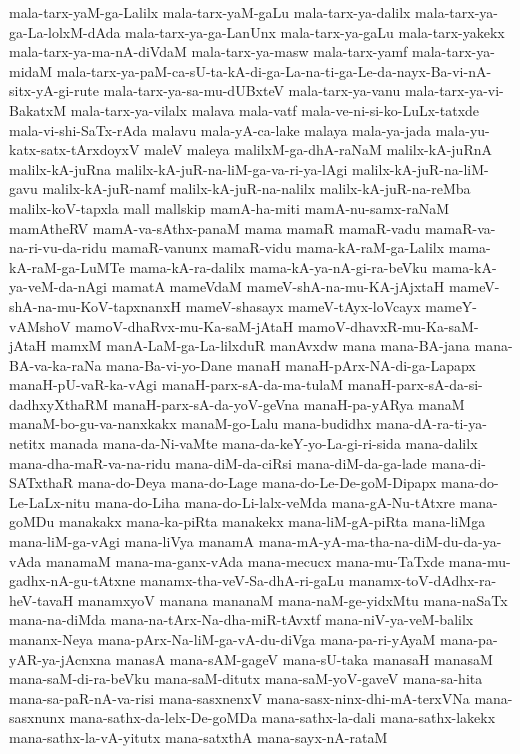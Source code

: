 {mala-tarx-yaM-ga-Lalilx
mala-tarx-yaM-gaLu
mala-tarx-ya-dalilx
mala-tarx-ya-ga-La-lolxM-dAda
mala-tarx-ya-ga-LanUnx
mala-tarx-ya-gaLu
mala-tarx-yakekx
mala-tarx-ya-ma-nA-diVdaM
mala-tarx-ya-masw
mala-tarx-yamf
mala-tarx-ya-midaM
mala-tarx-ya-paM-ca-sU-ta-kA-di-ga-La-na-ti-ga-Le-da-nayx-Ba-vi-nA-sitx-yA-gi-rute
mala-tarx-ya-sa-mu-dUBxteV
mala-tarx-ya-vanu
mala-tarx-ya-vi-BakatxM
mala-tarx-ya-vilalx
malava
mala-vatf
mala-ve-ni-si-ko-LuLx-tatxde
mala-vi-shi-SaTx-rAda
malavu
mala-yA-ca-lake
malaya
mala-ya-jada
mala-yu-katx-satx-tArxdoyxV
maleV
maleya
malilxM-ga-dhA-raNaM
malilx-kA-juRnA
malilx-kA-juRna
malilx-kA-juR-na-liM-ga-va-ri-ya-lAgi
malilx-kA-juR-na-liM-gavu
malilx-kA-juR-namf
malilx-kA-juR-na-nalilx
malilx-kA-juR-na-reMba
malilx-koV-tapxla
mall
mallskip
mamA-ha-miti
mamA-nu-samx-raNaM
mamAtheRV
mamA-va-sAthx-panaM
mama
mamaR
mamaR-vadu
mamaR-va-na-ri-vu-da-ridu
mamaR-vanunx
mamaR-vidu
mama-kA-raM-ga-Lalilx
mama-kA-raM-ga-LuMTe
mama-kA-ra-dalilx
mama-kA-ya-nA-gi-ra-beVku
mama-kA-ya-veM-da-nAgi
mamatA
mameVdaM
mameV-shA-na-mu-KA-jAjxtaH
mameV-shA-na-mu-KoV-tapxnanxH
mameV-shasayx
mameV-tAyx-loVcayx
mameY-vAMshoV
mamoV-dhaRvx-mu-Ka-saM-jAtaH
mamoV-dhavxR-mu-Ka-saM-jAtaH
mamxM
manA-LaM-ga-La-lilxduR
manAvxdw
mana
mana-BA-jana
mana-BA-va-ka-raNa
mana-Ba-vi-yo-Dane
manaH
manaH-pArx-NA-di-ga-Lapapx
manaH-pU-vaR-ka-vAgi
manaH-parx-sA-da-ma-tulaM
manaH-parx-sA-da-si-dadhxyXthaRM
manaH-parx-sA-da-yoV-geVna
manaH-pa-yARya
manaM
manaM-bo-gu-va-nanxkakx
manaM-go-Lalu
mana-budidhx
mana-dA-ra-ti-ya-netitx
manada
mana-da-Ni-vaMte
mana-da-keY-yo-La-gi-ri-sida
mana-dalilx
mana-dha-maR-va-na-ridu
mana-diM-da-ciRsi
mana-diM-da-ga-lade
mana-di-SATxthaR
mana-do-Deya
mana-do-Lage
mana-do-Le-De-goM-Dipapx
mana-do-Le-LaLx-nitu
mana-do-Liha
mana-do-Li-lalx-veMda
mana-gA-Nu-tAtxre
mana-goMDu
manakakx
mana-ka-piRta
manakekx
mana-liM-gA-piRta
mana-liMga
mana-liM-ga-vAgi
mana-liVya
manamA
mana-mA-yA-ma-tha-na-diM-du-da-ya-vAda
manamaM
mana-ma-ganx-vAda
mana-mecucx
mana-mu-TaTxde
mana-mu-gadhx-nA-gu-tAtxne
manamx-tha-veV-Sa-dhA-ri-gaLu
manamx-toV-dAdhx-ra-heV-tavaH
manamxyoV
manana
mananaM
mana-naM-ge-yidxMtu
mana-naSaTx
mana-na-diMda
mana-na-tArx-Na-dha-miR-tAvxtf
mana-niV-ya-veM-balilx
mananx-Neya
mana-pArx-Na-liM-ga-vA-du-diVga
mana-pa-ri-yAyaM
mana-pa-yAR-ya-jAcnxna
manasA
mana-sAM-gageV
mana-sU-taka
manasaH
manasaM
mana-saM-di-ra-beVku
mana-saM-ditutx
mana-saM-yoV-gaveV
mana-sa-hita
mana-sa-paR-nA-va-risi
mana-sasxnenxV
mana-sasx-ninx-dhi-mA-terxVNa
mana-sasxnunx
mana-sathx-da-lelx-De-goMDa
mana-sathx-la-dali
mana-sathx-lakekx
mana-sathx-la-vA-yitutx
mana-satxthA
mana-sayx-nA-rataM
}
